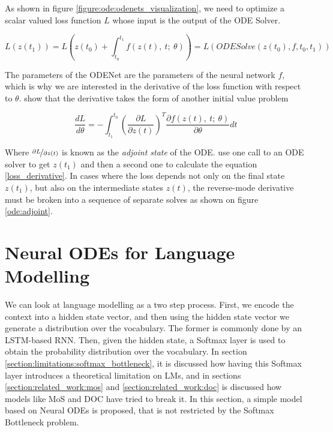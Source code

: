 As shown in figure \ref{figure:ode:odenets_visualization}, we need to optimize a scalar valued loss function $ L $ whose input is the output of the ODE Solver.

\begin{equation}
    L(z(t_1)) = L \left( z(t_0) + \int_{t_0}^{t_1} f(z(t), \ t; \ \theta ) \right) = L(ODESolve(z(t_0), f, t_0, t_1))
\end{equation}

The parameters of the ODENet are the parameters of the neural network $ f $, which is why we are interested in the derivative of the loss function with respect to $ \theta $. \citet{pontryagin2018mathematical} show that the derivative takes the form of another initial value problem

\begin{equation}
    \label{loss_derivative}
    \frac{dL}{d\theta} = - \int_{t_1}^{t_0} \left(\frac{\partial L}{\partial z(t)}\right)^T \frac{\partial f(z(t), \ t; \ \theta)}{\partial \theta}dt
\end{equation}

Where $ \nicefrac{\partial L}{\partial z(t)} $ is known as the \emph{adjoint state} of the ODE. \citet{chen2018neural} use one call to an ODE solver to get $ z(t_1) $ and then a second one to calculate the equation \ref{loss_derivative}. In cases where the loss depends not only on the final state $ z(t_1) $, but also on the intermediate states $ z(t) $, the reverse-mode derivative must be broken into a sequence of separate solves as shown on figure \ref{ode:adjoint}.

\section{Neural ODEs for Language Modelling}
\label{section:ode:ode_lms}

We can look at language modelling as a two step process. First, we encode the context into a hidden state vector, and then using the hidden state vector we generate a distribution over the vocabulary. The former is commonly done by an LSTM-based RNN. Then, given the hidden state, a Softmax layer is used to obtain the probability distribution over the vocabulary. In section \ref{section:limitations:softmax_bottleneck}, it is discussed how having this Softmax layer introduces a theoretical limitation on LMs, and in sections \ref{section:related_work:mos} and \ref{section:related_work:doc} is discussed how models like MoS \citep{yang2017breaking} and DOC \citep{takase2018direct} have tried to break it. In this section, a simple model based on Neural ODEs is proposed, that is not restricted by the Softmax Bottleneck problem.

